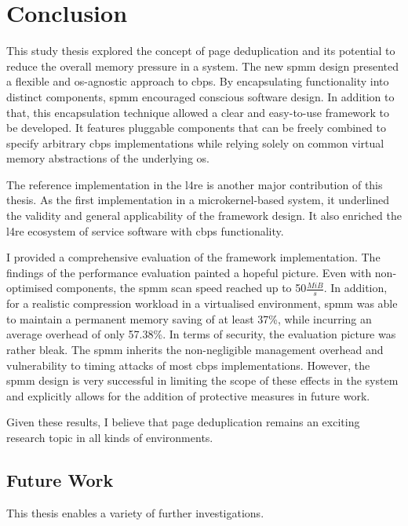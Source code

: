 \chapter{Conclusion}
\label{chap:conclusion}

This study thesis explored the concept of page deduplication and its potential to reduce the overall memory pressure in a system.
The new \ac{spmm} design presented a flexible and \ac{os}-agnostic approach to \acl{cbps}.
By encapsulating functionality into distinct components, \ac{spmm} encouraged conscious software design.
In addition to that, this encapsulation technique allowed a clear and easy-to-use framework to be developed.
It features pluggable components that can be freely combined to specify arbitrary \ac{cbps} implementations while relying solely on common virtual memory abstractions of the underlying \ac{os}.

The reference implementation in the \acl{l4re} is another major contribution of this thesis.
As the first implementation in a microkernel-based system, it underlined the validity and general applicability of the framework design.
It also enriched the \ac{l4re} ecosystem of service software with \ac{cbps} functionality.

I provided a comprehensive evaluation of the framework implementation.
The findings of the performance evaluation painted a hopeful picture.
Even with non-optimised components, the \ac{spmm} scan speed reached up to 50$\frac{MiB}{s}$.
In addition, for a realistic compression workload in a virtualised environment, \ac{spmm} was able to maintain a permanent memory saving of at least 37\%, while incurring an average overhead of only 57.38\%.
In terms of security, the evaluation picture was rather bleak.
The \ac{spmm} inherits the non-negligible management overhead and vulnerability to timing attacks of most \ac{cbps} implementations.
However, the \ac{spmm} design is very successful in limiting the scope of these effects in the system and explicitly allows for the addition of protective measures in future work.

Given these results, I believe that page deduplication remains an exciting research topic in all kinds of environments.

\section{Future Work}
\label{sec:future-work}

This thesis enables a variety of further investigations.

